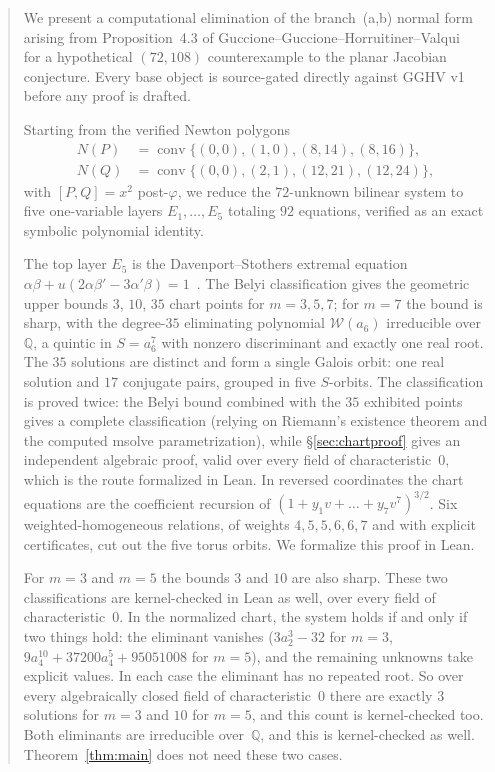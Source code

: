 \documentclass[a4paper,11pt]{article}
\theoremstyle{plain}
\theoremstyle{definition}
\theoremstyle{remark}
\begin{document}
\begin{abstract}
We present a computational elimination of the branch~(a,b) normal form arising from Proposition~4.3 of Guccione--Guccione--Horruitiner--Valqui~\cite{GGHV} for a hypothetical $(72,108)$ counterexample to the planar Jacobian conjecture. Every base object is source-gated directly against GGHV v1 before any proof is drafted.

Starting from the verified Newton polygons
\[
\begin{aligned}
N(P)&=\operatorname{conv}\{(0,0),(1,0),(8,14),(8,16)\},\\
N(Q)&=\operatorname{conv}\{(0,0),(2,1),(12,21),(12,24)\},
\end{aligned}
\]
with $[P,Q]=x^2$ post-$\varphi$, we reduce the $72$-unknown bilinear system to five one-variable layers $E_1,\dots,E_5$ totaling $92$ equations, verified as an exact symbolic polynomial identity.

The top layer $E_5$ is the Davenport--Stothers extremal equation $\alpha\beta+u(2\alpha\beta'-3\alpha'\beta)=1$~\cite{Stothers,Davenport}. The Belyi classification gives the geometric upper bounds $3$, $10$, $35$ chart points for $m=3,5,7$; for $m=7$ the bound is sharp, with the degree-$35$ eliminating polynomial $\mathcal{W}(a_6)$ irreducible over $\mathbb{Q}$, a quintic in $S=a_6^7$ with nonzero discriminant and exactly one real root. The $35$ solutions are distinct and form a single Galois orbit: one real solution and $17$ conjugate pairs, grouped in five $S$-orbits. The classification is proved twice: the Belyi bound combined with the $35$ exhibited points gives a complete classification (relying on Riemann's existence theorem and the computed msolve parametrization), while \S\ref{sec:chartproof} gives an independent algebraic proof, valid over every field of characteristic~$0$, which is the route formalized in Lean. In reversed coordinates the chart equations are the coefficient recursion of $(1+y_1v+\dots+y_7v^7)^{3/2}$. Six weighted-homogeneous relations, of weights $4,5,5,6,6,7$ and with explicit certificates, cut out the five torus orbits. We formalize this proof in Lean.

For $m=3$ and $m=5$ the bounds $3$ and $10$ are also sharp. These two classifications are kernel-checked in Lean as well, over every field of characteristic~$0$. In the normalized chart, the system holds if and only if two things hold: the eliminant vanishes ($3a_2^3-32$ for $m=3$, $9a_4^{10}+37200a_4^5+95051008$ for $m=5$), and the remaining unknowns take explicit values. In each case the eliminant has no repeated root. So over every algebraically closed field of characteristic~$0$ there are exactly $3$ solutions for $m=3$ and $10$ for $m=5$, and this count is kernel-checked too. Both eliminants are irreducible over~$\mathbb{Q}$, and this is kernel-checked as well. Theorem~\ref{thm:main} does not need these two cases.


\end{abstract}
\end{document}
